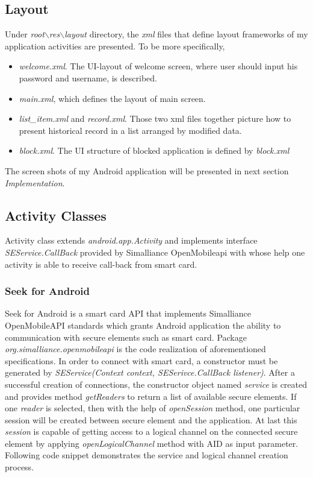 \subsection{Layout} \label{secLayout}
Under \emph{root$\backslash$res$\backslash$layout} directory, the \emph{xml} files that define layout frameworks of my application activities are presented. To be more specifically,
\begin{itemize}
\item \emph{welcome.xml}. The UI-layout of welcome screen, where user should input his password and username, is described.
\item \emph{main.xml}, which defines the layout of main screen.
\item \emph{list\_item.xml} and \emph{record.xml}. Those two xml files together picture how to present historical record in a list arranged by modified data.
\item \emph{block.xml}. The UI structure of blocked application is defined by \emph{block.xml}
\end{itemize}
The screen shots of my Android application will be presented in next section \emph{Implementation}.


\subsection{Activity Classes}
Activity class extends \emph{android.app.Activity} and implements interface \emph{SEService.CallBack} provided by Simalliance OpenMobileapi with whose help one activity is able to receive call-back from smart card. 
\subsubsection{Seek for Android}
Seek for Android is a smart card API that implements Simalliance OpenMobileAPI standards which grants Android application the ability to communication with secure elements such as smart card. Package \emph{org.simalliance.openmobileapi} is the code realization of aforementioned specifications. In order to connect with smart card, a constructor must be generated by \emph{SEService(Context context, SESerivce.CallBack listener)}. After a successful creation of connections, the constructor object named \emph{service} is created and provides method \emph{getReaders} to return a list of available secure elements. If one \emph{reader} is selected, then with the help of \emph{openSession} method, one particular session will be created between secure element and the application. At last this \emph{session} is capable of getting access to a logical channel on the connected secure element by applying \emph{openLogicalChannel} method with AID as input parameter. Following code snippet demonstrates the service and logical channel creation process\cite{open}.

